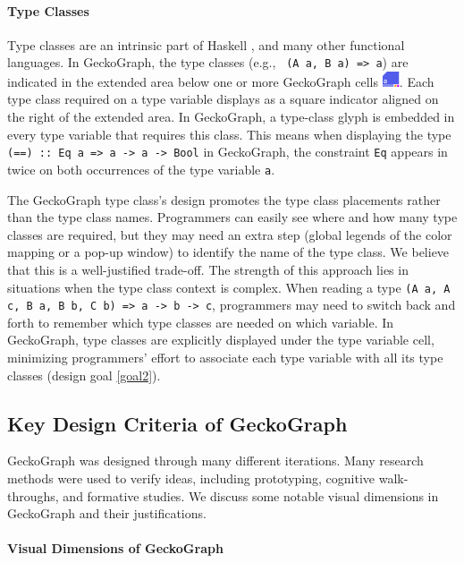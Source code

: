 \documentclass[preprint,12pt]{elsarticle}
\begin{document}
\paragraph{Type Classes} 
Type classes are an intrinsic part of Haskell \cite{Hudak2007-kn}, and many other functional languages. In GeckoGraph, the type classes (e.g., \texttt{ (A a, B a) => a}) are indicated in the extended area below one or more GeckoGraph cells \includegraphics[height=1.2em]{figures/TypeClass.png}. Each type class required on a type variable displays as a square indicator aligned on the right of the extended area. In GeckoGraph, a type-class glyph is embedded in every type variable that requires this class. This means when displaying the type \texttt{(==) :: Eq a => 
a -> a -> Bool} in GeckoGraph, the constraint \texttt{Eq} appears in twice on both occurrences of the type variable \texttt{a}. 

The GeckoGraph type class's design promotes the type class placements rather than the type class names. Programmers can easily see where and how many type classes are required, but they may need an extra step (global legends of the color mapping or a pop-up window) to identify the name of the type class. We believe that this is a well-justified trade-off. The strength of this approach lies in situations when the type class context is complex. When reading a type \texttt{(A a, A c, B a, B b, C b) => a -> b -> c}, programmers may need to switch back and forth to remember which type classes are needed on which variable. In GeckoGraph, type classes are explicitly displayed under the type variable cell,  minimizing programmers' effort to associate each type variable with all its type classes (design goal \ref{goal2}). 


\subsection{Key Design Criteria of GeckoGraph}\label{sec:benefits}

GeckoGraph was designed through many different iterations. Many research methods were used to verify ideas, including prototyping, cognitive walk-throughs, and formative studies. We discuss some notable visual dimensions in GeckoGraph and their justifications.


\paragraph{Visual Dimensions of GeckoGraph}
\end{document}
